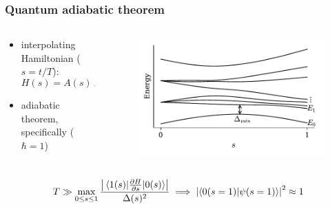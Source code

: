\documentclass[11pt]{beamer}
\newcommand{\itemb}{\item[$\bullet$]}
\begin{document}
\begin{frame}
    \frametitle{Quantum adiabatic theorem}
    \begin{columns}[T]
        \begin{column}{0.52\textwidth}
            \begin{itemize}
                \itemb interpolating Hamiltonian ($s = t/T$): $$H(s) = A(s) \, H_0 + B(s) \, H_P$$
                \itemb adiabatic theorem, specifically ($\hbar = 1$)
            \end{itemize}
        \end{column}
        \begin{column}{0.47\textwidth}
            \begin{figure}[!htb]
                \includegraphics[width=\textwidth]{../plots/ising_gap.pdf}
            \end{figure}
        \end{column}
    \end{columns}
    \vspace*{-1em}
    \begin{equation*}
        T \gg \max_{0 \leq s \leq 1} \frac{\left| \mel{1(s)}{\frac{\partial H}{\partial s}}{0(s)} \right|}{\Delta(s)^2}
        \implies \left\vert{\braket{0(s = 1)}{\psi(s = 1)}}\right\vert^2  \approx 1
    \end{equation*}
\end{frame}
\end{document}
